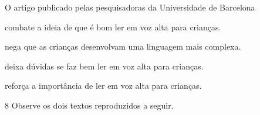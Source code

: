 O artigo publicado pelas pesquisadoras da Universidade de Barcelona

\begin{escolha}
\item combate a ideia de que é bom ler em voz alta para crianças.

\item nega que as crianças desenvolvam uma linguagem mais complexa.

\item deixa dúvidas se faz bem ler em voz alta para crianças.

\item reforça a importância de ler em voz alta para crianças.
\end{escolha}

\pagebreak
\num{8} Observe os dois textos reproduzidos a seguir.

